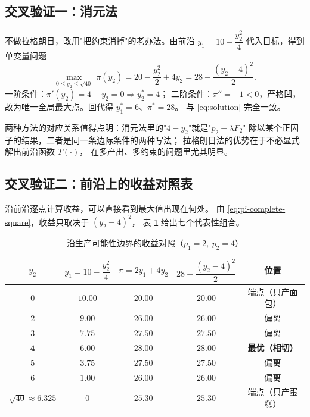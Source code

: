 \subsection{交叉验证一：消元法}

不做拉格朗日，改用"把约束消掉"的老办法。由前沿 $y_1=10-\dfrac{y_2^{2}}{4}$
代入目标，得到单变量问题
\begin{equation}
\max_{0\le y_2\le \sqrt{40}}\ \pi(y_2)=20-\frac{y_2^{2}}{2}+4y_2
=28-\frac{(y_2-4)^{2}}{2}.
\label{eq:onedim}
\end{equation}
一阶条件：$\pi'(y_2)=4-y_2=0\Rightarrow y_2^{*}=4$；
二阶条件：$\pi''=-1<0$，严格凹，故为唯一全局最大点。回代得 $y_1^{*}=6$、$\pi^{*}=28$。
与 \eqref{eq:solution} 完全一致。

两种方法的对应关系值得点明：消元法里的"$4-y_2$"就是"$p_2-\lambda F_2$"
除以某个正因子的结果，二者是同一条边际条件的两种写法；
拉格朗日法的优势在于不必显式解出前沿函数 $T(\cdot)$，
在多产出、多约束的问题里尤其明显。

\subsection{交叉验证二：前沿上的收益对照表}

沿前沿逐点计算收益，可以直接看到最大值出现在何处。
由 \eqref{eq:pi-complete-square}，收益只取决于 $(y_2-4)^{2}$，
表 \ref{tab:frontier-pi} 给出七个代表性组合。

\begin{table}[H]
\centering
\caption{沿生产可能性边界的收益对照（$p_1=2,\ p_2=4$）}
\label{tab:frontier-pi}
\begin{tabular}{ccccc}
\toprule
$y_2$  & $y_1=10-\dfrac{y_2^{2}}{4}$ & $\pi=2y_1+4y_2$ & $28-\dfrac{(y_2-4)^{2}}{2}$ & 位置 \\
\midrule
$0$      & $10.00$  & $20.00$  & $20.00$  & 端点（只产面包）\\
$2$      & $9.00$   & $26.00$  & $26.00$  & 偏离 \\
$3$      & $7.75$   & $27.50$  & $27.50$  & 偏离 \\
$\mathbf{4}$ & $\mathbf{6.00}$ & $\mathbf{28.00}$ & $\mathbf{28.00}$ & \textbf{最优（相切）}\\
$5$      & $3.75$   & $27.50$  & $27.50$  & 偏离 \\
$6$      & $1.00$   & $26.00$  & $26.00$  & 偏离 \\
$\sqrt{40}\approx 6.325$ & $0$ & $25.30$ & $25.30$ & 端点（只产蛋糕）\\
\bottomrule
\end{tabular}
\end{table}

